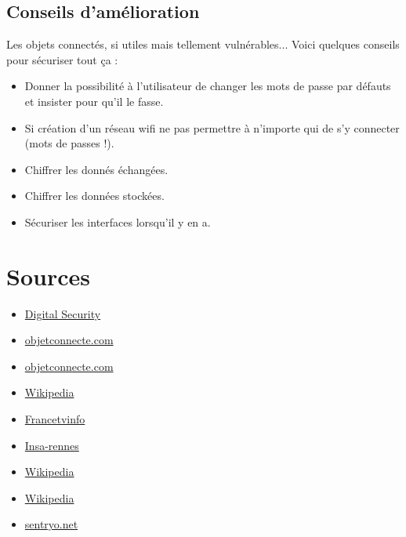 \documentclass[a4paper]{report}
\begin{document}
	\subsection{Conseils d'amélioration}
	Les objets connectés, si utiles mais tellement vulnérables... Voici quelques conseils pour sécuriser tout ça :
	\begin{itemize}
		\item Donner la possibilité à l'utilisateur de changer les mots de passe par défauts et insister pour qu'il le fasse.
		\item Si création d'un réseau wifi ne pas permettre à n'importe qui de s'y connecter (mots de passes !).
		\item Chiffrer les donnés échangées.
		\item Chiffrer les données stockées.
		\item Sécuriser les interfaces lorsqu'il y en a.
	\end{itemize}
	
	\newpage
	\section{Sources}
	\begin{itemize}
		\item \href{https://www.digital.security/en/blog/threats-connected-objects-issues-and-possibilities}{Digital Security}
		
		\item \href{https://www.objetconnecte.com/les-objets-connectes-un-risque-de-cybersecurite-majeur-dans-lentreprise-2310/}{objetconnecte.com}
		
		\item \href{https://www.objetconnecte.com/fbi-securite-iot-2409/}{objetconnecte.com}
		\item \href{https://fr.wikipedia.org/wiki/Shodan_%28site_web%29}{Wikipedia}
		\item \href{https://www.francetvinfo.fr/replay-radio/hyper-revue-de-presse/shodan-le-moteur-de-recherche-qui-se-connecte-a-votre-insu_1762849.html}{Francetvinfo}
		\item \href{http://objets.insa-rennes.fr/objets-connectes/quest-ce-quun-objet-connecte/}{Insa-rennes}
		\item \href{https://fr.wikipedia.org/wiki/Internet_des_objets}{Wikipedia}
		\item \href{https://fr.wikipedia.org/wiki/Botnet#Usages_des_botets}{Wikipedia}
		\item \href{https://www.sentryo.net/fr/botnet-iot-mirai-menace-cle-en-main-rendue-publique/}{sentryo.net}
	\end{itemize}
	
\end{document}
